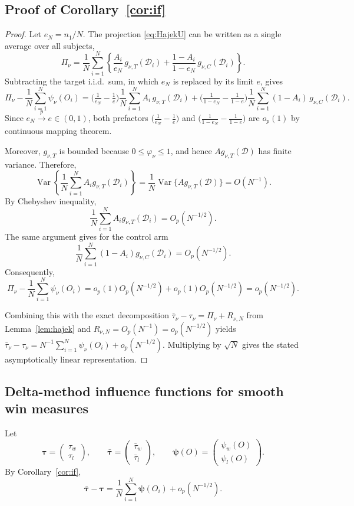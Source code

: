 \documentclass[11pt,a4paper]{article}
\newcommand{\Var}{\operatorname{Var}}
\newcommand{\Op}{O_p}
\begin{document}
\subsection{Proof of Corollary~\ref{cor:if}}\label{App:Cor1}
\begin{proof}
Let $e_N=n_1/N$. The projection \eqref{eq:HajekU} can be written as a single average over
all subjects,
\[
\Pi_\nu
=\frac1N\sum_{i=1}^N
\left\{
\frac{A_i}{e_N}\,g_{\nu,T}(\mathcal{D}_i)
+\frac{1-A_i}{1-e_N}\,g_{\nu,C}(\mathcal{D}_i)
\right\}.
\]
Subtracting the target i.i.d.\ sum, in which $e_N$ is replaced by its limit $e$, gives
\[
\Pi_\nu-\frac1N\sum_{i=1}^N\psi_\nu(O_i)
=\Big(\tfrac1{e_N}-\tfrac1e\Big)\frac1N\sum_{i=1}^N A_i\,g_{\nu,T}(\mathcal{D}_i)
+\Big(\tfrac1{1-e_N}-\tfrac1{1-e}\Big)\frac1N\sum_{i=1}^N (1-A_i)\,g_{\nu,C}(\mathcal{D}_i).
\]
Since $e_N\xrightarrow{p}e\in(0,1)$, both prefactors $\Big(\tfrac1{e_N}-\tfrac1e\Big)$ and $\Big(\tfrac1{1-e_N}-\tfrac1{1-e}\Big)$ are $o_p(1)$ by continuous mapping theorem. 

Moreover, \(g_{\nu,T}\) is bounded because \(0\le \varphi_\nu\le 1\), and hence
\(A g_{\nu,T}(\mathcal D)\) has finite variance. Therefore,
\[
\Var\left\{
\frac1N\sum_{i=1}^N A_i g_{\nu,T}(\mathcal D_i)
\right\}
=
\frac{1}{N}\Var\{A g_{\nu,T}(\mathcal D)\}
=O(N^{-1}).
\]
By Chebyshev inequality, 
\[
\frac1N\sum_{i=1}^N A_i g_{\nu,T}(\mathcal D_i)
=O_p(N^{-1/2}).
\]
The same argument gives for the control arm 
\[
\frac1N\sum_{i=1}^N (1-A_i)g_{\nu,C}(\mathcal D_i)
=O_p(N^{-1/2}).
\]
Consequently,
\[
\Pi_\nu-\frac1N\sum_{i=1}^N\psi_\nu(O_i)
=
o_p(1)O_p(N^{-1/2})+o_p(1)O_p(N^{-1/2})
=
o_p(N^{-1/2}).
\]

Combining this with the exact decomposition $\bar\tau_\nu-\tau_\nu=\Pi_\nu+R_{\nu,N}$ from
Lemma~\ref{lem:hajek} and $R_{\nu,N}=\Op(N^{-1})=o_p(N^{-1/2})$ yields
$\bar\tau_\nu-\tau_\nu=N^{-1}\sum_{i=1}^N\psi_\nu(O_i)+o_p(N^{-1/2})$. Multiplying by
$\sqrt N$ gives the stated asymptotically linear representation.
\end{proof}

\subsection{Delta-method influence functions for smooth win measures}
\label{app:if-winmeasure}

Let
\[
\boldsymbol\tau=
\begin{pmatrix}
\tau_w\\
\tau_l
\end{pmatrix},
\qquad
\bar{\boldsymbol\tau}=
\begin{pmatrix}
\bar\tau_w\\
\bar\tau_l
\end{pmatrix},
\qquad
\boldsymbol\psi(O)=
\begin{pmatrix}
\psi_w(O)\\
\psi_l(O)
\end{pmatrix}.
\]
By Corollary~\ref{cor:if},
\[
\bar{\boldsymbol\tau}-\boldsymbol\tau
=
\frac1N
\sum_{i=1}^N
\boldsymbol\psi(O_i)
+
o_p(N^{-1/2}).
\]
\end{document}
